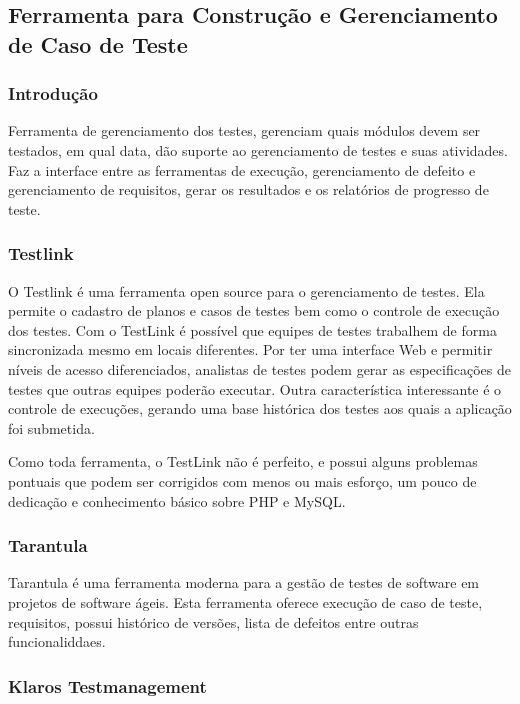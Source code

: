 \documentclass[12pt,a4paper]{article}
\begin{document}
	\clearpage		
	\subsection{Ferramenta para Construção e Gerenciamento de Caso de Teste}
		\subsubsection{Introdução}
		
			Ferramenta de gerenciamento dos testes, gerenciam quais módulos devem ser testados, em qual data, 
			dão suporte ao gerenciamento de testes e suas atividades. Faz a interface entre as ferramentas de execução, 
			gerenciamento de defeito e gerenciamento de requisitos, gerar os resultados e os relatórios de progresso de teste.
		
		\subsubsection{Testlink}
		
			O Testlink é uma ferramenta open source para o gerenciamento de testes. Ela permite o cadastro de planos e casos de testes bem como o controle de execução dos testes. 
			Com o TestLink é possível que equipes de testes trabalhem de forma sincronizada mesmo em locais diferentes. 
			Por ter uma interface Web e permitir níveis de acesso diferenciados, analistas de testes podem gerar as especificações de testes que outras equipes poderão executar. 
			Outra característica interessante é o controle de execuções, gerando uma base histórica dos testes aos quais a aplicação foi submetida.
			
			Como toda ferramenta, o TestLink não é perfeito, e possui alguns problemas pontuais que podem ser corrigidos com menos ou mais esforço, um pouco de dedicação e conhecimento básico sobre PHP e MySQL.
		
		
		\subsubsection{Tarantula}
		
			Tarantula é uma ferramenta moderna para a gestão de testes de software em projetos de software ágeis. 
			Esta ferramenta oferece execução de caso de teste, requisitos, possui histórico de versões, lista de defeitos entre outras funcionaliddaes.
		
		
		\subsubsection{Klaros Testmanagement}
		
\end{document}
